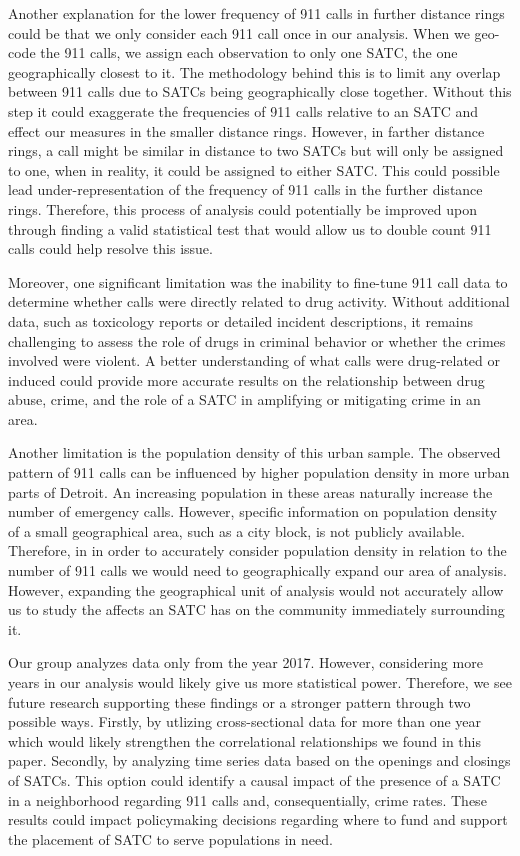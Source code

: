 \documentclass[12pt]{article}
\begin{document}
Another explanation for the lower frequency of 911 calls in further distance rings could be that we only consider each 911 call once in our analysis. When we geo-code the 911 calls, we assign each observation to only one SATC, the one geographically closest to it. The methodology behind this is to limit any overlap between 911 calls due to SATCs being geographically close together. Without this step it could exaggerate the frequencies of 911 calls relative to an SATC and effect our measures in the smaller distance rings.  However, in farther distance rings, a call might be similar in distance to two SATCs but will only be assigned to one, when in reality, it could be assigned to either SATC. This could possible lead under-representation of the frequency of 911 calls in the further distance rings. Therefore, this process of analysis could potentially be improved upon through finding a valid statistical test that would allow us to double count 911 calls could help resolve this issue. 

Moreover, one significant limitation was the inability to fine-tune 911 call data to determine whether calls were directly related to drug activity. Without additional data, such as toxicology reports or detailed incident descriptions, it remains challenging to assess the role of drugs in criminal behavior or whether the crimes involved were violent. A better understanding of what calls were drug-related or induced could provide more accurate results on the relationship between drug abuse, crime, and the role of a SATC in amplifying or mitigating crime in an area. 
    
Another limitation is the population density of this urban sample. The observed pattern of 911 calls can be influenced by higher population density in more urban parts of Detroit. An increasing population in these areas naturally increase the number of emergency calls. However, specific information on population density of a small geographical area, such as a city block, is not publicly available. Therefore, in in order to accurately consider population density in relation to the number of 911 calls we would need to geographically expand our area of analysis. However, expanding the geographical unit of analysis would not accurately allow us to study the affects an SATC has on the community immediately surrounding it. 

Our group analyzes data only from the year 2017. However, considering more years in our analysis would likely give us more statistical power. Therefore, we see future research supporting these findings or a stronger pattern through two possible ways. Firstly, by utlizing cross-sectional data for more than one year which would likely strengthen the correlational relationships we found in this paper. Secondly, by analyzing time series data based on the openings and closings of SATCs. This option could identify a causal impact of the presence of a SATC in a neighborhood regarding 911 calls and, consequentially, crime rates. These results could impact policymaking decisions regarding where to fund and support the placement of SATC to serve populations in need. 
\end{document}

